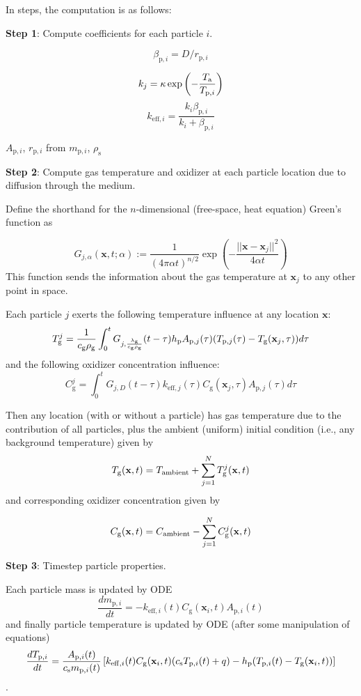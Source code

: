 \documentclass{article}
\begin{document}
In steps, the computation is as follows:

\bigskip
\bigskip

\textbf{Step 1}: Compute coefficients for each particle $i$.

$$\beta_{\mathrm{p},i} = D/r_{\mathrm{p},i}$$

$$k_j = \kappa \exp \left( - \frac{T_\mathrm{a}}{T_{\mathrm{p},i}} \right) $$
$$k_{\mathrm{eff},i} = \frac{k_i \beta_{\mathrm{p},i}}{k_i + \beta_{\mathrm{p},i}}$$

\begin{center}
$A_{\mathrm{p},i}$, $r_{\mathrm{p},i}$ from $m_{\mathrm{p},i}$, $\rho_\mathrm{s}$    
\end{center}

\bigskip


\textbf{Step 2}: Compute gas temperature and oxidizer at each particle location due to diffusion through the medium.

Define the shorthand for the $n$-dimensional (free-space, heat equation) Green's function as

$$
G_{j,\alpha}(\mathbf{x},t;\alpha) := \frac{1}{(4 \pi \alpha t)^{n/2}} \exp \left( - \frac{||\mathbf{x}-\mathbf{x}_j||^2}{4\alpha t} \right)
$$
This function sends the information about the gas temperature at $\mathbf{x}_j$ to any other point in space.

Each particle $j$ exerts the following temperature influence at any location $\mathbf{x}$:
$$T_\mathrm{g}^{j} = \frac{1}{c_\mathrm{g} \rho_\mathrm{g}} \int_0^t G_{j,\frac{\lambda_\mathrm{g}}{c_\mathrm{g} \rho_\mathrm{g}}} (t-\tau) h_{\mathrm{p}} A_{\mathrm{p},j} (\tau) (T_{\mathrm{p},j} (\tau) - T_\mathrm{g} (\mathbf{x}_j,\tau)) d\tau $$
and the following oxidizer concentration influence:
$$C_\mathrm{g}^{j} = \int_0^t G_{j,D} (t-\tau) k_{\mathrm{eff},j} (\tau) C_{\mathrm{g}} (\mathbf{x}_j,\tau) A_{\mathrm{p},j} (\tau) d\tau $$

Then any location (with or without a particle) has gas temperature due to the contribution of all particles, plus the ambient (uniform) initial condition (i.e., any background temperature) given by
$$T_\mathrm{g} (\mathbf{x},t) = T_\mathrm{ambient} + \sum_{j=1}^N T_\mathrm{g}^{j}(\mathbf{x},t)$$
and corresponding oxidizer concentration given by

$$C_\mathrm{g} (\mathbf{x},t) = C_\mathrm{ambient} - \sum_{j=1}^N C_\mathrm{g}^{j}(\mathbf{x},t)$$

\bigskip

\textbf{Step 3}: Timestep particle properties.

Each particle mass is updated by ODE
$$\frac{d m_{\mathrm{p},i}}{dt} = -k_{\mathrm{eff},i} (t) C_{\mathrm{g}}(\mathbf{x}_{i},t) A_{\mathrm{p},i}(t)$$
and finally particle temperature is updated by ODE (after some manipulation of equations)
$$ \frac{d T_{\mathrm{p},i}}{dt} = \frac{A_{\mathrm{p},i}(t)}{c_\mathrm{s} m_{\mathrm{p},i}(t)} \left[
k_{\mathrm{eff},i}(t) C_\mathrm{g} (\mathbf{x}_i,t) (c_\mathrm{s} T_{\mathrm{p},i}(t) + q) - h_{\mathrm{p}} (T_{\mathrm{p},i}(t) - T_\mathrm{g}(\mathbf{x}_i,t)) \right]$$.
\end{document}
